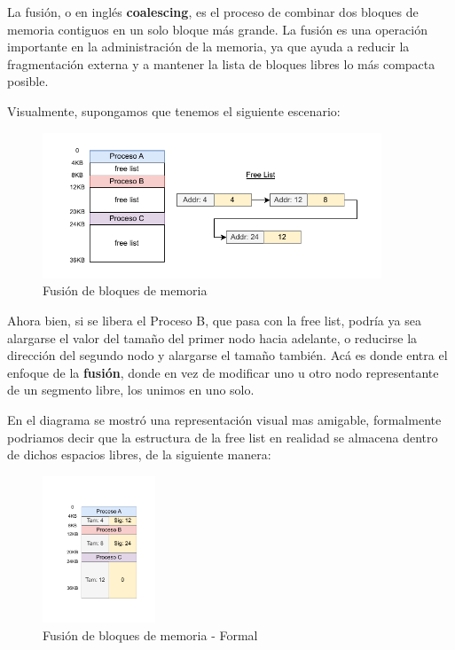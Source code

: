 \documentclass{article}
\begin{document}
\begin{definition}
    La fusión, o en inglés \textbf{coalescing}, es el proceso de combinar dos bloques de memoria contiguos en un solo bloque más grande. La fusión es una operación importante en la administración de la memoria, ya que ayuda a reducir la fragmentación externa y a mantener la lista de bloques libres lo más compacta posible.
\end{definition}

Visualmente, supongamos que tenemos el siguiente escenario:
\begin{figure}[h]
    \centering
    \includegraphics[width=0.9\textwidth]{src/fusion.pdf}
    \caption{Fusión de bloques de memoria}
\end{figure}

Ahora bien, si se libera el Proceso B, que pasa con la free list, podría ya sea alargarse el valor del tamaño del primer nodo hacia adelante, o reducirse la dirección del segundo nodo y alargarse el tamaño también. Acá es donde entra el enfoque de la \textbf{fusión}, donde en vez de modificar uno u otro nodo representante de un segmento libre, los unimos en uno solo.

En el diagrama se mostró una representación visual mas amigable, formalmente podriamos decir que la estructura de la free list en realidad se almacena dentro de dichos espacios libres, de la siguiente manera:

\begin{figure}[h]
    \centering
    \includegraphics[width=0.3\textwidth]{src/freelist.pdf}
    \caption{Fusión de bloques de memoria - Formal}
\end{figure}
\end{document}
